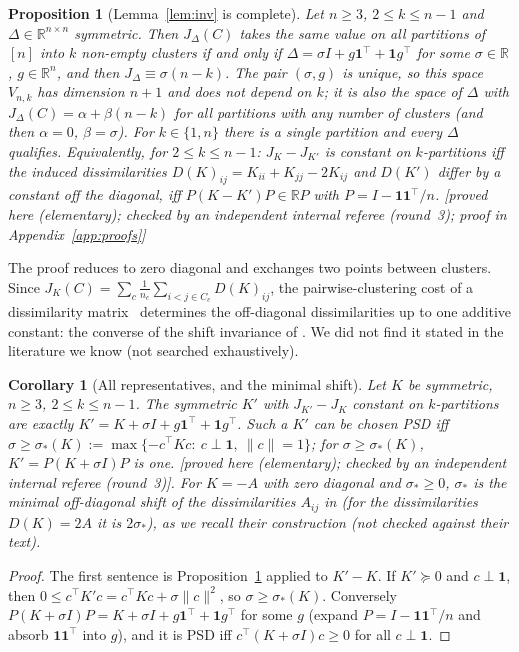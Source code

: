 \documentclass[11pt,a4paper]{article}
\theoremstyle{plain}
\newtheorem{proposition}[theorem]{Proposition}
\newtheorem{corollary}[theorem]{Corollary}
\theoremstyle{definition}
\theoremstyle{remark}
\newcommand{\R}{\mathbb{R}}
\newcommand{\one}{\mathbf 1}
\newcommand{\status}[1]{\textsf{\small [#1]}}
\newcommand{\rthree}{checked by an independent internal referee (round~3)}
\begin{document}
\begin{proposition}[Lemma~\ref{lem:inv} is complete]\label{prop:invcomplete}
Let $n\ge3$, $2\le k\le n-1$ and $\Delta\in\R^{n\times n}$ symmetric. Then $J_\Delta(C)$ takes the same value on all partitions of $[n]$ into $k$ non-empty clusters if and only if $\Delta=\sigma I+g\one^{\!\top}+\one g^{\!\top}$ for some $\sigma\in\R$, $g\in\R^n$, and then $J_\Delta\equiv\sigma(n-k)$. The pair $(\sigma,g)$ is unique, so this space $V_{n,k}$ has dimension $n+1$ and does not depend on $k$; it is also the space of $\Delta$ with $J_\Delta(C)=\alpha+\beta(n-k)$ for all partitions with any number of clusters (and then $\alpha=0$, $\beta=\sigma$). For $k\in\{1,n\}$ there is a single partition and every $\Delta$ qualifies. Equivalently, for $2\le k\le n-1$: $J_K-J_{K'}$ is constant on $k$-partitions iff the induced dissimilarities $D(K)_{ij}=K_{ii}+K_{jj}-2K_{ij}$ and $D(K')$ differ by a constant off the diagonal, iff $P(K-K')P\in\R P$ with $P=I-\one\one^{\!\top}/n$. \status{proved here (elementary); \rthree; proof in Appendix~\ref{app:proofs}}
\end{proposition}

\noindent The proof reduces to zero diagonal and exchanges two points between clusters. Since $J_K(C)=\sum_c\frac1{n_c}\sum_{i<j\in C_c}D(K)_{ij}$, the pairwise-clustering cost of a dissimilarity matrix~\citep{hofmann1997} determines the off-diagonal dissimilarities up to one additive constant: the converse of the shift invariance of \citet{roth2003}. We did not find it stated in the literature we know (not searched exhaustively).

\begin{corollary}[All representatives, and the minimal shift]\label{cor:reps}
Let $K$ be symmetric, $n\ge3$, $2\le k\le n-1$. The symmetric $K'$ with $J_{K'}-J_K$ constant on $k$-partitions are exactly $K'=K+\sigma I+g\one^{\!\top}+\one g^{\!\top}$. Such a $K'$ can be chosen PSD iff $\sigma\ge\sigma_*(K):=\max\{-c^{\!\top}Kc:\ c\perp\one,\ \lVert c\rVert=1\}$; for $\sigma\ge\sigma_*(K)$, $K'=P(K+\sigma I)P$ is one. \status{proved here (elementary); \rthree}. For $K=-A$ with zero diagonal and $\sigma_*\ge0$, $\sigma_*$ is the minimal off-diagonal shift of the dissimilarities $A_{ij}$ in \citet{roth2003} (for the dissimilarities $D(K)=2A$ it is $2\sigma_*$), as we recall their construction (not checked against their text).
\end{corollary}
\begin{proof}
The first sentence is Proposition~\ref{prop:invcomplete} applied to $K'-K$. If $K'\succeq0$ and $c\perp\one$, then $0\le c^{\!\top}K'c=c^{\!\top}Kc+\sigma\lVert c\rVert^2$, so $\sigma\ge\sigma_*(K)$. Conversely $P(K+\sigma I)P=K+\sigma I+g\one^{\!\top}+\one g^{\!\top}$ for some $g$ (expand $P=I-\one\one^{\!\top}/n$ and absorb $\one\one^{\!\top}$ into $g$), and it is PSD iff $c^{\!\top}(K+\sigma I)c\ge0$ for all $c\perp\one$.
\end{proof}
\end{document}
